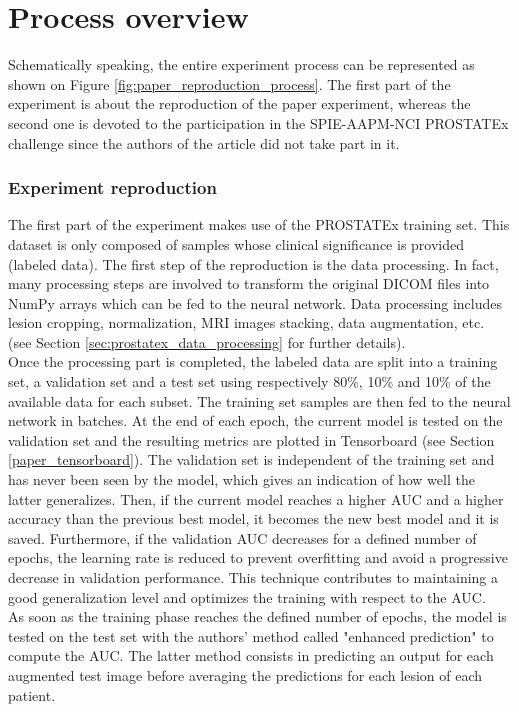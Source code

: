 \section{Process overview}
\setlength{\marginparwidth}{3cm}\leavevmode {}Schematically speaking, the entire experiment process can be represented as shown on Figure \ref{fig:paper_reproduction_process}. The first part of the experiment is about the reproduction of the paper experiment, whereas the second one is devoted to the participation in the SPIE-AAPM-NCI PROSTATEx challenge since the authors of the article did not take part in it.

\subsubsection{Experiment reproduction}
The first part of the experiment makes use of the PROSTATEx training set. This dataset is only composed of samples whose clinical significance is provided (labeled data). The first step of the reproduction is the data processing. In fact, many processing steps are involved to transform the original DICOM files into NumPy arrays which can be fed to the neural network. Data processing includes lesion cropping, normalization, MRI images stacking, data augmentation, etc. (see Section \ref{sec:prostatex_data_processing} for further details).\\
Once the processing part is completed, the labeled data are split into a training set, a validation set and a test set using respectively 80\%, 10\% and 10\% of the available data for each subset. The training set samples are then fed to the neural network in batches. 
At the end of each epoch, the current model is tested on the validation set and the resulting metrics are plotted in Tensorboard (see Section \ref{paper_tensorboard}). The validation set is independent of the training set and has never been seen by the model, which gives an indication of how well the latter generalizes. Then, if the current model reaches a higher AUC and a higher accuracy than the previous best model, it becomes the new best model and it is saved. Furthermore, if the validation AUC decreases for a defined number of epochs, the learning rate is reduced to prevent overfitting and avoid a progressive decrease in validation performance. This technique contributes to maintaining a good generalization level and optimizes the training with respect to the AUC.\\
As soon as the training phase reaches the defined number of epochs, the model is tested on the test set with the authors' method called "enhanced prediction" to compute the AUC. The latter method consists in predicting an output for each augmented test image before averaging the predictions for each lesion of each patient.

